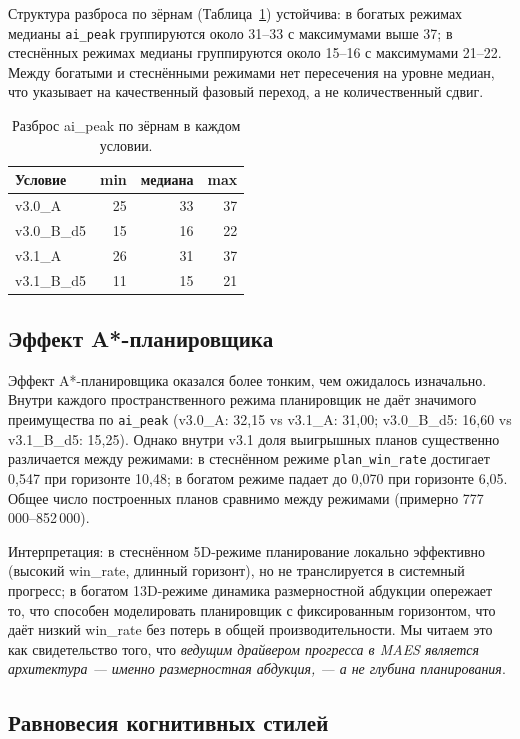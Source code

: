 \documentclass[11pt,a4paper]{article}
\begin{document}
Структура разброса по зёрнам (Таблица~\ref{tab:spread-ru})
устойчива: в богатых режимах медианы \texttt{ai\_peak} группируются
около 31--33 с максимумами выше 37; в стеснённых режимах медианы
группируются около 15--16 с максимумами 21--22. Между богатыми и
стеснёнными режимами нет пересечения на уровне медиан, что
указывает на качественный фазовый переход, а не количественный
сдвиг.

\begin{table}[h]
\centering
\caption{Разброс ai\_peak по зёрнам в каждом условии.}
\label{tab:spread-ru}
\small
\begin{tabular}{lrrr}
\toprule
Условие & min & медиана & max \\
\midrule
v3.0\_A     & 25 & 33 & 37 \\
v3.0\_B\_d5 & 15 & 16 & 22 \\
v3.1\_A     & 26 & 31 & 37 \\
v3.1\_B\_d5 & 11 & 15 & 21 \\
\bottomrule
\end{tabular}
\end{table}

\subsection{Эффект A*-планировщика}

Эффект A*-планировщика оказался более тонким, чем ожидалось
изначально. Внутри каждого пространственного режима планировщик
не даёт значимого преимущества по \texttt{ai\_peak}
(v3.0\_A: 32{,}15 vs v3.1\_A: 31{,}00; v3.0\_B\_d5: 16{,}60 vs
v3.1\_B\_d5: 15{,}25). Однако внутри v3.1 доля выигрышных планов
существенно различается между режимами: в стеснённом режиме
\texttt{plan\_win\_rate} достигает 0{,}547 при горизонте 10{,}48;
в богатом режиме падает до 0{,}070 при горизонте 6{,}05. Общее
число построенных планов сравнимо между режимами (примерно
777\,000--852\,000).

Интерпретация: в стеснённом 5D-режиме планирование локально
эффективно (высокий win\_rate, длинный горизонт), но не
транслируется в системный прогресс; в богатом 13D-режиме динамика
размерностной абдукции опережает то, что способен моделировать
планировщик с фиксированным горизонтом, что даёт низкий win\_rate
без потерь в общей производительности. Мы читаем это как
свидетельство того, что \emph{ведущим драйвером прогресса в
MAES является архитектура --- именно размерностная абдукция, ---
а не глубина планирования}.

\subsection{Равновесия когнитивных стилей}
\end{document}
